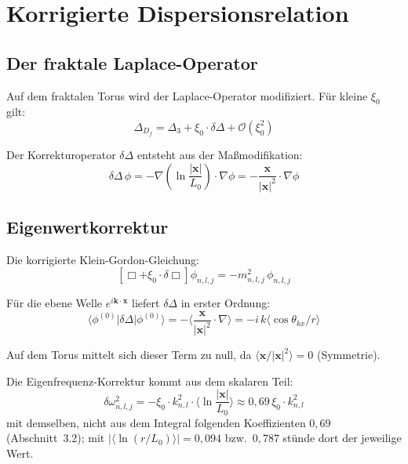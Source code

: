 \section{Korrigierte Dispersionsrelation}

\subsection{Der fraktale Laplace-Operator}

Auf dem fraktalen Torus wird der Laplace-Operator modifiziert.
Für kleine $\xi_0$ gilt:
\begin{equation}
  \Delta_{D_f} = \Delta_3 + \xi_0 \cdot \delta\Delta + \mathcal{O}(\xi_0^2)
  \label{eq:frak-laplace}
\end{equation}

Der Korrekturoperator $\delta\Delta$ entsteht aus der
Maßmodifikation:
\begin{equation}
  \delta\Delta\,\phi
  = -\nabla\!\left(\ln\frac{|\mathbf{x}|}{L_0}\right)\cdot\nabla\phi
  = -\frac{\mathbf{x}}{|\mathbf{x}|^2}\cdot\nabla\phi
  \label{eq:delta-Delta}
\end{equation}

\subsection{Eigenwertkorrektur}

Die korrigierte Klein-Gordon-Gleichung:
\begin{equation}
  \left[\Box + \xi_0\cdot\delta\Box\right]\phi_{n,l,j}
  = -m_{n,l,j}^2\,\phi_{n,l,j}
\end{equation}

Für die ebene Welle $e^{i\mathbf{k}\cdot\mathbf{x}}$ liefert
$\delta\Delta$ in erster Ordnung:
\begin{equation}
  \langle\phi^{(0)}|\delta\Delta|\phi^{(0)}\rangle
  = -\langle\frac{\mathbf{x}}{|\mathbf{x}|^2}\cdot\nabla\rangle
  = -i\,k\langle\cos\theta_{kx}/r\rangle
\end{equation}

Auf dem Torus mittelt sich dieser Term zu null, da
$\langle \mathbf{x}/|\mathbf{x}|^2 \rangle = 0$ (Symmetrie).

Die Eigenfrequenz-Korrektur kommt aus dem skalaren Teil:
\begin{equation}
  \delta\omega_{n,l,j}^2
  = -\xi_0 \cdot k_{n,l}^2 \cdot \langle\ln\frac{|\mathbf{x}|}{L_0}\rangle
  \approx 0{,}69\,\xi_0 \cdot k_{n,l}^2
  \label{eq:omega-korrektur}
\end{equation}
mit demselben, nicht aus dem Integral folgenden Koeffizienten $0{,}69$
(Abschnitt~3.2); mit $|\langle\ln(r/L_0)\rangle| = 0{,}094$ bzw.\
$0{,}787$ stünde dort der jeweilige Wert.

